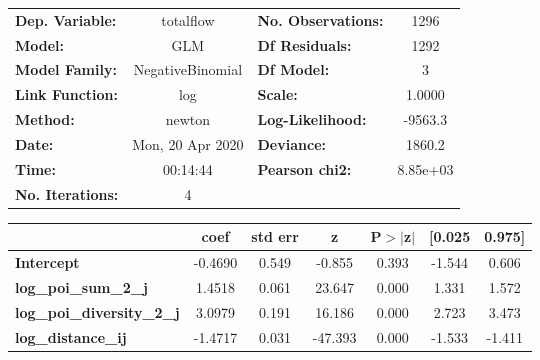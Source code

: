 \begin{center}
\begin{tabular}{lclc}
\toprule
\textbf{Dep. Variable:}            &    totalflow     & \textbf{  No. Observations:  } &     1296    \\
\textbf{Model:}                    &       GLM        & \textbf{  Df Residuals:      } &     1292    \\
\textbf{Model Family:}             & NegativeBinomial & \textbf{  Df Model:          } &        3    \\
\textbf{Link Function:}            &       log        & \textbf{  Scale:             } &    1.0000   \\
\textbf{Method:}                   &      newton      & \textbf{  Log-Likelihood:    } &   -9563.3   \\
\textbf{Date:}                     & Mon, 20 Apr 2020 & \textbf{  Deviance:          } &    1860.2   \\
\textbf{Time:}                     &     00:14:44     & \textbf{  Pearson chi2:      } &  8.85e+03   \\
\textbf{No. Iterations:}           &        4         & \textbf{                     } &             \\
\bottomrule
\end{tabular}
\begin{tabular}{lcccccc}
                                   & \textbf{coef} & \textbf{std err} & \textbf{z} & \textbf{P$> |$z$|$} & \textbf{[0.025} & \textbf{0.975]}  \\
\midrule
\textbf{Intercept}                 &      -0.4690  &        0.549     &    -0.855  &         0.393        &       -1.544    &        0.606     \\
\textbf{log\_poi\_sum\_2\_j}       &       1.4518  &        0.061     &    23.647  &         0.000        &        1.331    &        1.572     \\
\textbf{log\_poi\_diversity\_2\_j} &       3.0979  &        0.191     &    16.186  &         0.000        &        2.723    &        3.473     \\
\textbf{log\_distance\_ij}         &      -1.4717  &        0.031     &   -47.393  &         0.000        &       -1.533    &       -1.411     \\
\bottomrule
\end{tabular}
\end{center}